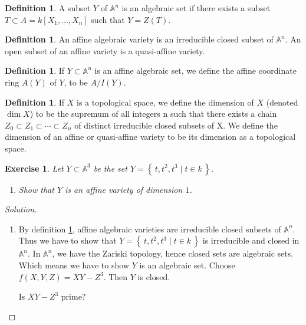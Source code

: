 \documentclass[11pt]{book}
\newtheorem{exercise}{Exercise}[section]
\newenvironment{solution}
  {\renewcommand{\qedsymbol}{}\begin{proof}[Solution]}
  {\end{proof}}
\theoremstyle{definition}
\newtheorem{definition}[theorem]{Definition}
\numberwithin{equation}{section}
\newcommand{\makeset}[2]{\left\{\, #1 \mathrel{\mid} #2 \,\right\}}
\begin{document}
\begin{defbox}
    \begin{definition}
        A subset \(Y\) of \(\mathbb{A}^n\) is an algebraic set if there exists a subset \(T \subset A = k[X_1, \ldots, X_n]\) such that \(Y = Z(T)\).
    \end{definition}
\end{defbox}


\begin{defbox}
    \begin{definition}
        \label{def:algebraic_variety}
        An affine algebraic variety is an irreducible closed subset of \(\mathbb{A}^n\). An open subset of an affine variety is a quasi-affine variety.
    \end{definition}
\end{defbox}

\begin{defbox}
    \begin{definition}
        \label{def:affine_coordinate_ring}
        If \(Y \subset \mathbb{A}^n\) is an affine algebraic set, we define the affine coordinate ring \(A(Y)\) of \(Y\), to be \(A / I(Y)\). 
    \end{definition}
\end{defbox}

\begin{defbox}
    \begin{definition}
        \label{def:dimension_topological_space}
        If \(X\) is a topological space, we define the dimension of \(X\) (denoted
        \(\dim  X\)) to be the supremum of all integers n such that there exists a chain \(Z_0 \subset Z_1 \subset \cdots \subset Z_n\) of distinct irreducible closed subsets of X. We define the dimension of an affine or quasi-affine variety to be its dimension as a topological space. 
    \end{definition}
\end{defbox}

% 
\begin{exercise}
    Let \(Y \subset \mathbb{A}^3\) be the set \(Y = \makeset{t, t^2, t^3}{t \in k}\).
    \begin{enumerate}
        \item Show that \(Y\) is an affine variety of dimension \(1\).
    \end{enumerate}
\end{exercise}
\begin{solution}
    \begin{enumerate}
        \item By definition \ref{def:algebraic_variety}, affine algebraic varieties are irreducible closed subsets of \(\mathbb{A}^n\). Thus we have to show that \(Y = \makeset{t, t^2, t^3}{t \in k}\) is irreducible and closed in \(\mathbb{A}^n\). In \(\mathbb{A}^n\), we have the Zariski topology, hence closed sets are algebraic sets. Which means we have to show \(Y\) is an algebraic set. Choose \(f(X, Y, Z) = XY - Z^3\). Then \(Y\) is closed.
        
        Is \(XY - Z^3\) prime?
    \end{enumerate}
\end{solution}

\printbibliography
\end{document}
